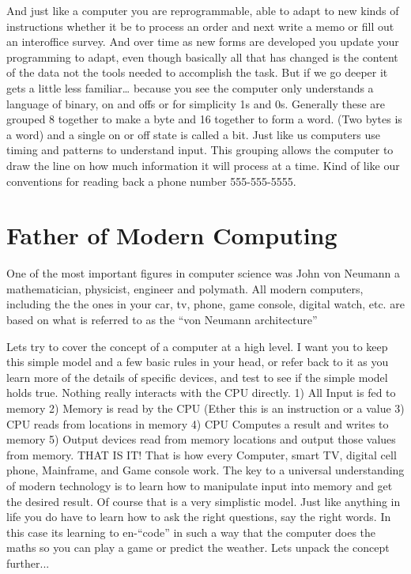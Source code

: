 And just like a computer you are reprogrammable, able to adapt to new kinds of instructions whether it be to process an order and next write a memo or fill out an interoffice survey. And over time as new forms are developed you update your programming to adapt, even though basically all that has changed is the content of the data not the tools needed to accomplish the task.
But if we go deeper it gets a little less familiar… because you see the computer only understands a language of binary, on and offs or for simplicity 1s and 0s. Generally these are grouped 8 together to make a byte and 16 together to form a word. (Two bytes is a word) and a single on or off state is called a bit.
Just like us computers use timing and patterns to understand input.
This grouping allows the computer to draw the line on how much information it will process at a time. Kind of like our conventions for reading back a phone number 555-555-5555.

\section{Father of Modern Computing}

One of the most important figures in computer science was John von Neumann a mathematician, physicist, engineer and polymath.
All modern computers, including the the ones in your car, tv, phone, game console, digital watch, etc. are based on what is referred to as the “von Neumann architecture”


Lets try to cover the concept of a computer at a high level. I want you to keep this simple model and a few basic rules in your head, or refer back to it as you learn more of the details of specific devices, and test to see if the simple model holds true.
Nothing really interacts with the CPU directly. 1) All Input is fed to memory 2) Memory is read by the CPU (Ether this is an instruction or a value 3) CPU reads from locations in memory 4) CPU Computes a result and writes to memory 5) Output devices read from memory locations and output those values from memory.
THAT IS IT! That is how every Computer, smart TV, digital cell phone, Mainframe, and Game console work. The key to a universal understanding of modern technology is to learn how to manipulate input into memory and get the desired result. 
Of course that is a very simplistic model. Just like anything in life you do have to learn how to ask the right questions, say the right words. In this case its learning to en-“code” in such a way that the computer does the maths so you can play a game or predict the weather. 
Lets unpack the concept further...

